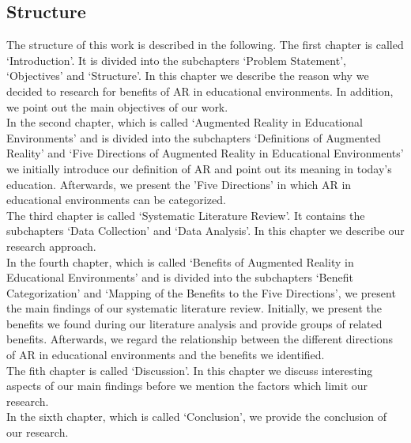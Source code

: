 \subsection{Structure}
The structure of this work is described in the following. The first chapter is called ‘Introduction’. It is divided into the subchapters ‘Problem Statement’, ‘Objectives’ and ‘Structure’. In this chapter we describe the reason why we decided to research for benefits of AR in educational environments. In addition, we point out the main objectives of our work.\\
In the second chapter, which is called ‘Augmented Reality in Educational Environments’ and is divided into the subchapters ‘Definitions of Augmented Reality’ and ‘Five Directions of Augmented Reality in Educational Environments’ we initially introduce our definition of AR and point out its meaning in today's education. Afterwards, we present the 'Five Directions' \autocite [cf.][]{Yuen.2011} in which AR in educational environments can be categorized.\\
The third chapter is called ‘Systematic Literature Review’. It contains the subchapters ‘Data Collection’ and ‘Data Analysis’. In this chapter we describe our research approach.\\
In the fourth chapter, which is called ‘Benefits of Augmented Reality in Educational Environments’ and is divided into the subchapters ‘Benefit Categorization’ and ‘Mapping of the Benefits to the Five Directions’, we present the main findings of our systematic literature review. Initially, we present the benefits we found during our literature analysis and provide groups of related benefits. Afterwards, we regard the relationship between the different directions of AR in educational environments and the benefits we identified.\\
The fith chapter is called ‘Discussion’. In this chapter we discuss interesting aspects of our main findings before we mention the factors which limit our research.\\
In the sixth chapter, which is called ‘Conclusion’, we provide the conclusion of our research.